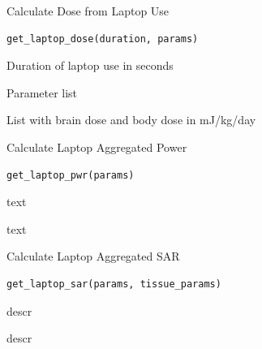\documentclass[a4paper]{book}
\begin{document}
%
\begin{Description}
Calculate Dose from Laptop Use
\end{Description}
%
\begin{Usage}
\begin{verbatim}
get_laptop_dose(duration, params)
\end{verbatim}
\end{Usage}
%
\begin{Arguments}
\begin{ldescription}
\item[\code{duration}] Duration of laptop use in seconds

\item[\code{params}] Parameter list
\end{ldescription}
\end{Arguments}
%
\begin{Value}
List with brain dose and body dose in mJ/kg/day
\end{Value}
%
\begin{Description}
Calculate Laptop Aggregated Power
\end{Description}
%
\begin{Usage}
\begin{verbatim}
get_laptop_pwr(params)
\end{verbatim}
\end{Usage}
%
\begin{Arguments}
\begin{ldescription}
\item[\code{params}] text
\end{ldescription}
\end{Arguments}
%
\begin{Value}
text
\end{Value}
%
\begin{Description}
Calculate Laptop Aggregated SAR
\end{Description}
%
\begin{Usage}
\begin{verbatim}
get_laptop_sar(params, tissue_params)
\end{verbatim}
\end{Usage}
%
\begin{Arguments}
\begin{ldescription}
\item[\code{params}] descr

\item[\code{tissue\_params}] descr
\end{ldescription}
\end{Arguments}
\end{document}
